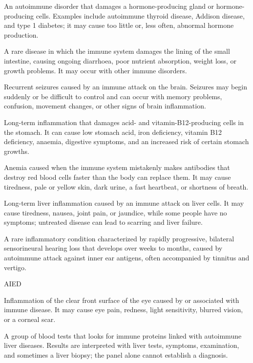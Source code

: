  An autoimmune disorder that damages a hormone-producing gland or hormone-producing cells. Examples include autoimmune thyroid disease, Addison disease, and type 1 diabetes; it may cause too little or, less often, abnormal hormone production.

 A rare disease in which the immune system damages the lining of the small intestine, causing ongoing diarrhoea, poor nutrient absorption, weight loss, or growth problems. It may occur with other immune disorders.

 Recurrent seizures caused by an immune attack on the brain. Seizures may begin suddenly or be difficult to control and can occur with memory problems, confusion, movement changes, or other signs of brain inflammation.

 Long-term inflammation that damages acid- and vitamin-B12-producing cells in the stomach. It can cause low stomach acid, iron deficiency, vitamin B12 deficiency, anaemia, digestive symptoms, and an increased risk of certain stomach growths.

 Anemia caused when the immune system mistakenly makes antibodies that destroy red blood cells faster than the body can replace them. It may cause tiredness, pale or yellow skin, dark urine, a fast heartbeat, or shortness of breath.

 Long-term liver inflammation caused by an immune attack on liver cells. It may cause tiredness, nausea, joint pain, or jaundice, while some people have no symptoms; untreated disease can lead to scarring and liver failure.

 A rare inflammatory condition characterized by rapidly progressive, bilateral sensorineural hearing loss that develops over weeks to months, caused by autoimmune attack against inner ear antigens, often accompanied by tinnitus and vertigo.

\synonyms
AIED

 Inflammation of the clear front surface of the eye caused by or associated with immune disease. It may cause eye pain, redness, light sensitivity, blurred vision, or a corneal scar.

 A group of blood tests that looks for immune proteins linked with autoimmune liver diseases. Results are interpreted with liver tests, symptoms, examination, and sometimes a liver biopsy; the panel alone cannot establish a diagnosis.

